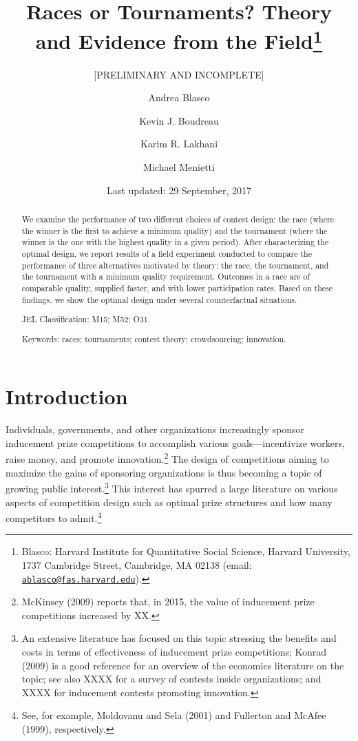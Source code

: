 \documentclass[11pt, titlepage]{article}
\title{Races or Tournaments? Theory and Evidence from the Field\thanks{Blasco: Harvard Institute for Quantitative Social Science, Harvard
University, 1737 Cambridge Street, Cambridge, MA 02138 (email:
\href{mailto:ablasco@fas.harvard.edu}{\nolinkurl{ablasco@fas.harvard.edu}}).}}
\subtitle{{[}PRELIMINARY AND INCOMPLETE{]}}
\author{Andrea Blasco \and Kevin J. Boudreau \and Karim R. Lakhani \and Michael Menietti}
\date{Last updated: 29 September, 2017}
\begin{document}
\maketitle
\begin{abstract}
We examine the performance of two different choices of contest design:
the race (where the winner is the first to achieve a minimum quality)
and the tournament (where the winner is the one with the highest quality
in a given period). After characterizing the optimal design, we report
results of a field experiment conducted to compare the performance of
three alternatives motivated by theory: the race, the tournament, and
the tournament with a minimum quality requirement. Outcomes in a race
are of comparable quality, supplied faster, and with lower participation
rates. Based on these findings, we show the optimal design under several
counterfactual situations.

\smallskip\noindent 
JEL Classification: M15; M52; O31.

\smallskip\noindent 
Keywords: races; tournaments; contest theory; crowdsourcing; innovation.
\end{abstract}


\clearpage
\tableofcontents
\setcounter{tocdepth}{2}
\clearpage

\section{Introduction}\label{introduction}

Individuals, governments, and other organizations increasingly sponsor
inducement prize competitions to accomplish various goals---incentivize
workers, raise money, and promote innovation.\footnote{McKinsey (2009)
  reports that, in 2015, the value of inducement prize competitions
  increased by XX.} The design of competitions aiming to maximize the
gains of sponsoring organizations is thus becoming a topic of growing
public interest.\footnote{An extensive literature has focused on this
  topic stressing the benefits and costs in terms of effectiveness of
  inducement prize competitions; Konrad (2009) is a good reference for
  an overview of the economics literature on the topic; see also XXXX
  for a survey of contests inside organizations; and XXXX for inducement
  contests promoting innovation.} This interest has spurred a large
literature on various aspects of competition design such as optimal
prize structures and how many competitors to admit.\footnote{See, for
  example, Moldovanu and Sela (2001) and Fullerton and McAfee (1999),
  respectively.}
\end{document}
